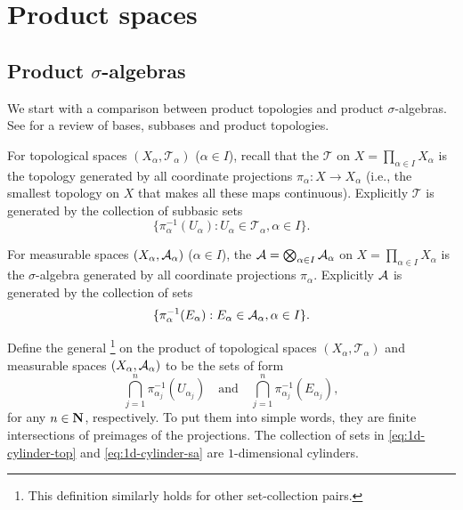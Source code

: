 \chapter{Product spaces}
\section{Product \texorpdfstring{$\sigma$-algebras}{sigma-algebra}}

We start with a comparison between product topologies and product $\sigma$-algebras. See \cite[Sections 4.1 and 4.2]{folland1999} for a review of bases, subbases and product topologies.

For topological spaces $(X_\alpha,\mathcal{T}_\alpha)$ ($\alpha \in I$), recall that the  $\mathcal{T}$ on $X = \prod_{\alpha \in I} X_\alpha$ is the topology generated by all coordinate projections $\pi_\alpha\colon X \to X_\alpha$ (i.e., the smallest topology on $X$ that makes all these maps continuous). Explicitly $\mathcal T$ is generated by the collection of subbasic sets \begin{equation} \label{eq:1d-cylinder-top}
    \{\pi_\alpha^{-1}(U_\alpha): U_\alpha\in \mathcal{T}_\alpha, \alpha \in I\}.
\end{equation}
    
For measurable spaces $(X_\alpha, \mathcal{A}_\alpha)$ ($\alpha \in I$), the  $\mathcal{A} = \bigotimes_{\alpha\in I} \mathcal{A}_\alpha$ on $X = \prod_{\alpha \in I} X_\alpha$ is the $\sigma$-algebra generated by all coordinate projections $\pi_\alpha$. Explicitly $\mathcal{A}$ is generated by the collection of sets \begin{equation} \label{eq:1d-cylinder-sa}
     \{\pi_\alpha^{-1}(E_\alpha): E_\alpha\in \A_\alpha, \alpha \in I\}.
\end{equation}

Define the general \footnote{This definition similarly holds for other set-collection pairs.} on the product of topological spaces $(X_\alpha,\mathcal{T}_\alpha)$ and measurable spaces $(X_\alpha,\mathcal{A}_\alpha)$ to be the sets of form \[
    \bigcap_{j=1}^n \pi_{\alpha_{j}}^{-1}(U_{\alpha_j}) \quad \text{and} \quad \bigcap_{j=1}^n \pi_{\alpha_{j}}^{-1}(E_{\alpha_j}),
\] for any $n \in \mathbf{N}$, respectively. To put them into simple words, they are finite intersections of preimages of the projections. The collection of sets in \eqref{eq:1d-cylinder-top} and \eqref{eq:1d-cylinder-sa} are $1$-dimensional cylinders.

